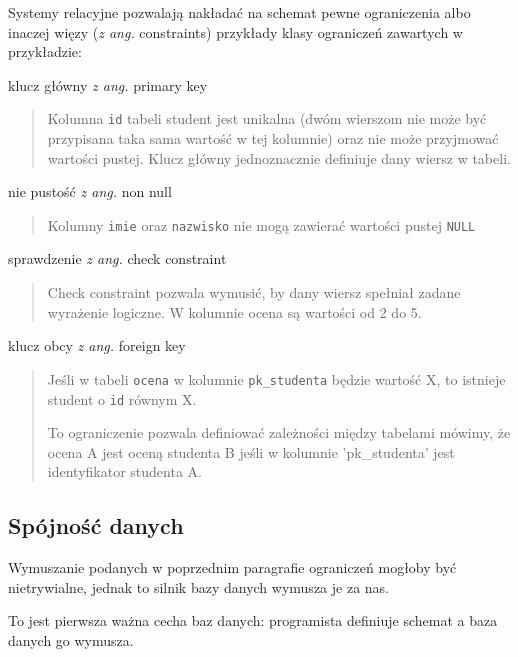 \documentclass[a4paper]{article}
\begin{document}
Systemy relacyjne pozwalają nakładać na schemat pewne ograniczenia albo inaczej
więzy (\emph{z ang.} constraints) przykłady klasy ograniczeń zawartych w przykładzie:

klucz główny \emph{z ang.} primary key
%
\begin{quote}

Kolumna \texttt{id} tabeli student jest unikalna (dwóm wierszom nie może być
przypisana taka sama wartość w tej kolumnie) oraz nie może przyjmować
wartości pustej. Klucz główny jednoznacznie definiuje dany wiersz w tabeli.

\end{quote}

nie pustość \emph{z ang.} non null
%
\begin{quote}

Kolumny \texttt{imie} oraz \texttt{nazwisko} nie mogą zawierać wartości pustej \texttt{NULL}

\end{quote}

sprawdzenie \emph{z ang.} check constraint
%
\begin{quote}

Check constraint pozwala wymusić, by dany wiersz spełniał zadane wyrażenie
logiczne. W kolumnie ocena są wartości od 2 do 5.

\end{quote}

klucz obcy \emph{z ang.} foreign key
%
\begin{quote}

Jeśli w tabeli \texttt{ocena} w kolumnie \texttt{pk\_studenta} będzie
wartość X, to istnieje student o \texttt{id} równym X.

To ograniczenie pozwala definiować zależności między tabelami mówimy, że
ocena A jest oceną studenta B jeśli w kolumnie 'pk\_studenta' jest
identyfikator studenta A.

\end{quote}


\subsection{Spójność danych%
  \label{spojnosc-danych}%
}

Wymuszanie podanych w poprzednim paragrafie ograniczeń mogłoby być
nietrywialne, jednak to silnik bazy danych wymusza je za nas.

To jest pierwsza ważna cecha baz danych: programista definiuje
schemat a baza danych go wymusza.
\end{document}

